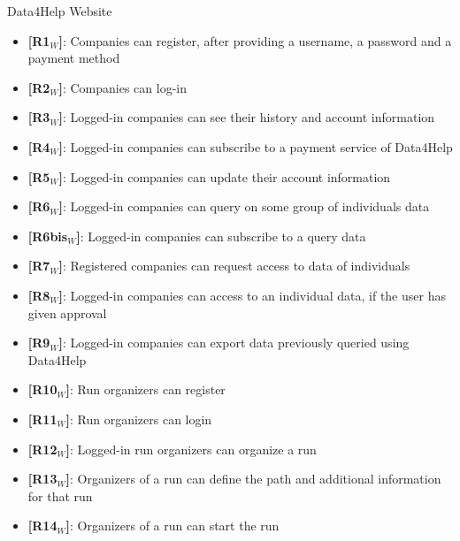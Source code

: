 \noindent Data4Help Website
\begin{itemize}
    \item \textbf{[R1$_W$]}: Companies can register, after providing a username, a password and a payment method
    \item \textbf{[R2$_W$]}: Companies can log-in
    \item \textbf{[R3$_W$]}: Logged-in companies can see their history and account information
    \item \textbf{[R4$_W$]}: Logged-in companies can subscribe to a payment service of Data4Help
    \item \textbf{[R5$_W$]}: Logged-in companies can update their account information
    \item \textbf{[R6$_W$]}: Logged-in companies can query on some group of individuals data
    \item \textbf{[R6bis$_W$]}: Logged-in companies can subscribe to a query data
    \item \textbf{[R7$_W$]}: Registered companies can request access to data of individuals
    \item \textbf{[R8$_W$]}: Logged-in companies can access to an individual data, if the user has given approval
    \item \textbf{[R9$_W$]}: Logged-in companies can export data previously queried using Data4Help
    
    \item \textbf{[R10$_W$]}: Run organizers can register
    \item \textbf{[R11$_W$]}: Run organizers can login
    \item \textbf{[R12$_W$]}: Logged-in run organizers can organize a run
    \item \textbf{[R13$_W$]}: Organizers of a run can define the path and additional information for that run
    \item \textbf{[R14$_W$]}: Organizers of a run can start the run
    
\end{itemize}

